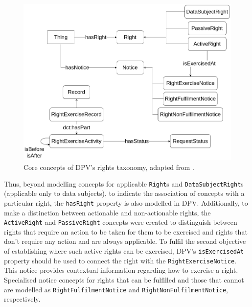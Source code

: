 \begin{figure}[ht]
    \centering
    \includegraphics[width=\linewidth]{figures/chapter-4/DPV-rights.png}
    \caption{Core concepts of DPV's rights taxonomy, adapted from \cite{pandit_primer_2022} .}
    \label{fig:rights_dpv}
\end{figure}

Thus, beyond modelling concepts for applicable \texttt{Right}s and \texttt{DataSubjectRight}s (applicable only to data subjects), to indicate the association of concepts with a particular right, the \texttt{hasRight} property is also modelled in DPV.
Additionally, to make a distinction between actionable and non-actionable rights, the \texttt{ActiveRight} and \texttt{PassiveRight} concepts were created to distinguish between rights that require an action to be taken for them to be exercised and rights that don't require any action and are always applicable.%
To fulfil the second objective of establishing where such active rights can be exercised, DPV's \texttt{isExercisedAt} property should be used to connect the right with the \texttt{RightExerciseNotice}.
This notice provides contextual information regarding how to exercise a right.
Specialised notice concepts for rights that can be fulfilled and those that cannot are modelled as \texttt{RightFulfilmentNotice} and \texttt{RightNonFulfilmentNotice}, respectively.

